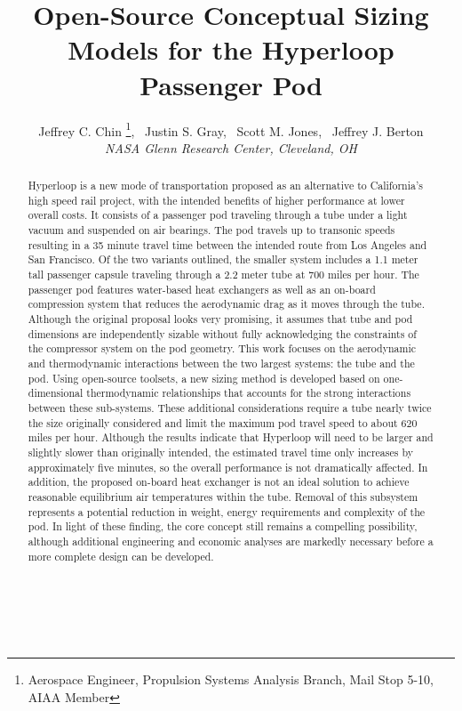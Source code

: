 \documentclass[]             %
{aiaa-tc}                       %
\title{Open-Source Conceptual Sizing Models for the Hyperloop Passenger Pod}
\author{
  Jeffrey C. Chin%
     \footnote{Aerospace Engineer, Propulsion Systems Analysis Branch, Mail Stop 5-10, AIAA Member},
  \ Justin S. Gray\footnotemark[\value{footnote}] ,%
  \ Scott M. Jones\footnotemark[\value{footnote}] ,%
  \ Jeffrey J. Berton\footnotemark[\value{footnote}]%
   \\
  {\normalsize\itshape
  NASA Glenn Research Center, Cleveland, OH}
}
\begin{document}
\maketitle

\begin{abstract}
Hyperloop is a new mode of transportation proposed as an alternative to California's high speed rail project,
with the intended benefits of higher performance at lower overall costs.
It consists of a passenger pod traveling through a tube under a light vacuum and suspended on air bearings.
The pod travels up to transonic speeds resulting in a 35 minute travel time
between the intended route from Los Angeles and San Francisco.
Of the two variants outlined, the smaller system includes a 1.1 meter tall passenger
capsule traveling through a 2.2 meter tube at 700 miles per hour.
The passenger pod features water-based heat exchangers as well as an on-board compression
system that reduces the aerodynamic drag as it moves through the tube.
Although the original proposal looks very promising,
it assumes that tube and pod dimensions are independently sizable without fully acknowledging
the constraints of the compressor system on the pod geometry.
This work focuses on the aerodynamic and thermodynamic interactions between the two largest systems: the tube and the pod.
Using open-source toolsets, a new sizing method is developed based on one-dimensional thermodynamic relationships
that accounts for the strong interactions between these sub-systems.
These additional considerations require a tube nearly twice the size originally considered
and limit the maximum pod travel speed to about 620 miles per hour.
Although the results indicate that Hyperloop will need to be larger and slightly slower than originally intended,
the estimated travel time only increases by approximately five minutes, so the overall performance is not dramatically affected.
In addition, the proposed on-board heat exchanger is not an ideal solution
to achieve reasonable equilibrium air temperatures within the tube.
Removal of this subsystem represents a potential reduction in weight, energy requirements and complexity of the pod.
In light of these finding, the core concept still remains a compelling possibility,
although additional engineering and economic analyses are markedly necessary before a more complete design can be developed.
\\
\\
\\
\\

\end{abstract}  

\setcounter{secnumdepth}{1}
\setcounter{tocdepth}{1}
\printnomenclature
 





\end{document}
